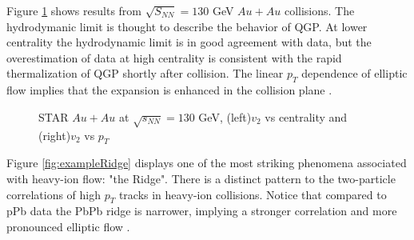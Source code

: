 Figure \ref{fig:exampleStarKine} shows results from $\sqrt{S_{NN}}=130$ GeV $Au+Au$ collisions. The hydrodymanic limit is thought to describe the behavior of QGP. At lower centrality the hydrodynamic limit is in good agreement with data, but the overestimation of data at high centrality is consistent with the rapid thermalization of QGP shortly after collision. The linear $p_T$ dependence of elliptic flow implies that the expansion is enhanced in the collision plane \cite{Ackermann:200tr}. 

\begin{figure}%
    \centering
    \qquad
    \caption{STAR $Au+Au$ at $\sqrt{s_{NN}}=130$ GeV, (left)$v_2$ vs centrality and (right)$v_2$ vs $p_T$ \cite{Ackermann:2000tr}}%
    \label{fig:exampleStarKine}%
\end{figure}

Figure \ref{fig:exampleRidge} displays one of the most striking phenomena associated with heavy-ion flow: "the Ridge". There is a distinct pattern to the two-particle correlations of high $p_T$ tracks in heavy-ion collisions. Notice that compared to pPb data the PbPb ridge is narrower, implying a stronger correlation and more pronounced elliptic flow \cite{Chatrchyan:2013nka}. 

